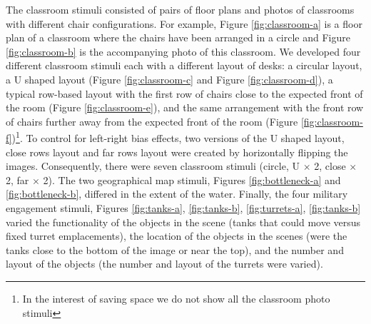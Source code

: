\documentclass[11pt,letterpaper]{article}
\begin{document}
The classroom stimuli consisted of pairs of floor plans and photos of classrooms with different chair configurations. For example, Figure \ref{fig:classroom-a} is a floor plan of a classroom where the chairs have been arranged in a circle and Figure \ref{fig:classroom-b} is the accompanying photo of this classroom. We developed four different classroom stimuli each with a different layout of desks: a circular layout, a U shaped layout (Figure \ref{fig:classroom-c} and Figure \ref{fig:classroom-d}), a typical row-based layout with the first row of chairs close to the expected front of the room (Figure \ref{fig:classroom-e}), and the same arrangement with the front row of chairs further away from the expected front of the room (Figure \ref{fig:classroom-f})\footnote{In the interest of saving space we do not show all the classroom photo stimuli}. To control for left-right bias effects, two versions of the U shaped layout, close rows layout and far rows layout were created by horizontally flipping the images. Consequently, there were seven classroom stimuli (circle, U $\times$ 2, close $\times$ 2, far $\times$ 2).  The two geographical map stimuli, Figures \ref{fig:bottleneck-a} and \ref{fig:bottleneck-b}, differed in the extent of the water.  Finally, the four military engagement stimuli, Figures \ref{fig:tanks-a}, \ref{fig:tanks-b}, \ref{fig:turrets-a}, \ref{fig:tanks-b} varied the functionality of the objects in the scene (tanks that could move versus fixed turret emplacements), the location of the objects in the scenes (were the tanks close to the bottom of the image or near the top), and the number and layout of the objects (the number and layout of the turrets were varied). 
\end{document}
